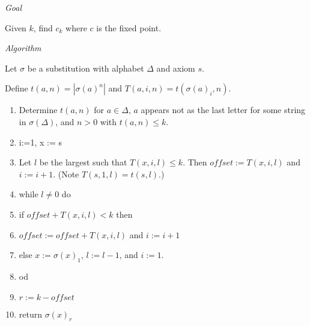 \documentclass[a4paper]{article}
\begin{document}
\emph{Goal}

Given $k$, find $c_k$ where $c$ is the fixed point.

\emph{Algorithm}

Let $\sigma$ be a substitution with alphabet $\Delta$ and axiom $s$.

Define $t(a,n) = |\sigma(a)^n|$ and $T(a,i,n) = t(\sigma(a)_i,n)$.

\begin{enumerate}
\item Determine $t(a,n)$ for $a \in \Delta$, $a$ appears not
as the last letter for some string in $\sigma(\Delta)$, and $n > 0$
with $t(a,n) \leq k$.

\item i:=1, x := s

\item Let $l$ be the largest such that $T(x,i,l) \leq k$. Then
$of\! fset := T(x,i,l)$ and $i := i+1$. (Note $T(s,1,l) = t(s,l)$.)

\item while $l \not= 0$ do

\item if $of\! fset + T(x,i,l) < k$ then

\item $of\! fset := of\! fset + T(x,i,l)$ and $i := i+1$

\item else $x := \sigma(x)_1$, $l := l-1$, and $i := 1$.

\item od

\item $r := k - of\! fset$

\item return $\sigma(x)_r$
\end{enumerate}
\end{document}
